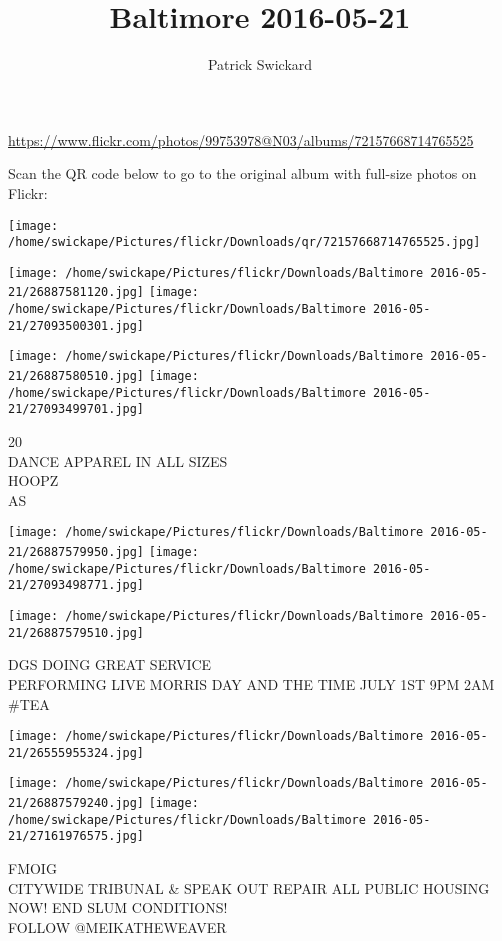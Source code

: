 \documentclass[10pt,letterpaper]{article}
\title{Baltimore 2016-05-21}
\author{Patrick Swickard}
\date{}
\begin{document}
\maketitle

\url{https://www.flickr.com/photos/99753978@N03/albums/72157668714765525}

Scan the QR code below to go to the original album with full-size photos on Flickr:

\texttt{[image: /home/swickape/Pictures/flickr/Downloads/qr/72157668714765525.jpg]}
\pagebreak

\texttt{[image: /home/swickape/Pictures/flickr/Downloads/Baltimore 2016-05-21/26887581120.jpg]}
\texttt{[image: /home/swickape/Pictures/flickr/Downloads/Baltimore 2016-05-21/27093500301.jpg]}

\texttt{[image: /home/swickape/Pictures/flickr/Downloads/Baltimore 2016-05-21/26887580510.jpg]}
\texttt{[image: /home/swickape/Pictures/flickr/Downloads/Baltimore 2016-05-21/27093499701.jpg]}

20\\
DANCE APPAREL IN ALL SIZES\\
HOOPZ\\
AS
\pagebreak

\texttt{[image: /home/swickape/Pictures/flickr/Downloads/Baltimore 2016-05-21/26887579950.jpg]}
\texttt{[image: /home/swickape/Pictures/flickr/Downloads/Baltimore 2016-05-21/27093498771.jpg]}

\vspace{0.25in}
\texttt{[image: /home/swickape/Pictures/flickr/Downloads/Baltimore 2016-05-21/26887579510.jpg]}

DGS DOING GREAT SERVICE\\
PERFORMING LIVE MORRIS DAY AND THE TIME JULY 1ST 9PM 2AM\\
\#TEA
\pagebreak

\texttt{[image: /home/swickape/Pictures/flickr/Downloads/Baltimore 2016-05-21/26555955324.jpg]}

\vspace{0.25in}
\texttt{[image: /home/swickape/Pictures/flickr/Downloads/Baltimore 2016-05-21/26887579240.jpg]}
\texttt{[image: /home/swickape/Pictures/flickr/Downloads/Baltimore 2016-05-21/27161976575.jpg]}

FMOIG\\
CITYWIDE TRIBUNAL \& SPEAK OUT REPAIR ALL PUBLIC HOUSING NOW!  END SLUM CONDITIONS!\\
FOLLOW @MEIKATHEWEAVER
\pagebreak
\end{document}
